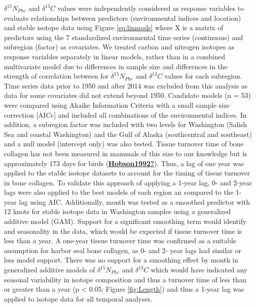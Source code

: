 \documentclass [11pt, proquest] {uwthesis}[2015/03/03]
\begin{document}
\(\delta^{15}N_{Phe}\) and \(\delta^{13}C\) values were independently considered as response variables to evaluate relationships between predictors (environmental indices and location) and stable isotope data using Figure \eqref{eq:linmods} where X is a matrix of predictors using the 7 standardized environmental time series (continuous) and subregion (factor) as covariates. We treated carbon and nitrogen isotopes as response variables separately in linear models, rather than in a combined multivariate model due to differences in sample size and differences in the strength of correlation between for \(\delta^{15}N_{Phe}\) and \(\delta^{13}C\) values for each subregion. Time series data prior to 1950 and after 2014 was excluded from this analysis as data for some covariates did not extend beyond 1950. Candidate models (n = 53) were compared using Akaike Information Criteria with a small sample size correction {[}AICc{]} and included all combinations of the environmental indices. In addition, a subregion factor was included with two levels for Washington (Salish Sea and coastal Washington) and the Gulf of Alaska (southcentral and southeast) and a null model (intercept only) was also tested. Tissue turnover time of bone collagen has not been measured in mammals of this size to our knowledge but is approximately 173 days for birds (\protect\hyperlink{ref-Hobson1992}{\textbf{Hobson1992?}}). Thus, a lag of one year was applied to the stable isotope datasets to account for the timing of tissue turnover in bone collagen. To validate this approach of applying a 1-year lag, 0- and 2-year lags were also applied to the best models of each region an compared to the 1-year lag using AIC. Additionally, month was tested as a smoothed predictor with 12 knots for stable isotope data in Washington samples using a generalized additive model (GAM). Support for a significant smoothing term would identify and seasonality in the data, which would be expected if tissue turnover time is less than a year. A one-year tissue turnover time was confirmed as a suitable assumption for harbor seal bone collagen, as 0- and 2- year lags had similar or less model support. There was no support for a smoothing effect by month in generalized additive models of \(\delta^{15}N_{Phe}\) and \(\delta^{13}C\) which would have indicated any seasonal variability in isotope composition and thus a turnover time of less than or greater than a year (p \textless{} 0.05; Figure \ref{fig:Length}) and thus a 1-year lag was applied to isotope data for all temporal analyses.
\end{document}
